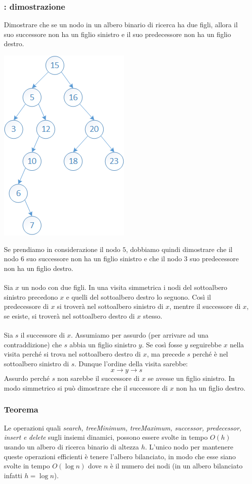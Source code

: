 \documentclass[italian]{article}
\newcommand{\varOmicron}{O}
\newcommand{\exercize}{\text{\faPencil $\;$ Esercizio }}
\begin{document}
\subsubsection{\exercize: dimostrazione}
Dimostrare che se un nodo in un albero binario di ricerca ha due figli, allora il suo successore non ha un figlio sinistro e il suo predecessore non ha un figlio destro.
\begin{center}
	\includegraphics[width=0.3\linewidth]{images/albero_binario_esempio}
\end{center}
Se prendiamo in considerazione il nodo $5$, dobbiamo quindi dimostrare che il nodo $6$ suo successore non ha un figlio sinistro e che il nodo $3$ suo predecessore non ha un figlio destro. \\\\
Sia $x$ un nodo con due figli. In una visita simmetrica i nodi del sottoalbero sinistro precedono $x$ e quelli del sottoalbero destro lo seguono. Così il predecessore di $x$ si troverà nel sottoalbero sinistro di $x$, mentre il successore di $x$, se esiste, si troverà nel sottoalbero destro di $x$ stesso. \\\\
Sia $s$ il successore di $x$. Assumiamo per assurdo (per arrivare ad una contraddizione) che $s$ abbia un figlio sinistro $y$. Se così fosse $y$ seguirebbe $x$ nella visita perché si trova nel sottoalbero destro di $x$, ma precede $s$ perché è nel sottoalbero sinistro di $s$. Dunque l'ordine della visita sarebbe:
\[
	x \to y \to s
\]
Assurdo perché $s$ non sarebbe il successore di $x$ se avesse un figlio sinistro. In modo simmetrico si può dimostrare che il successore di $x$ non ha un figlio destro.

\subsubsection{Teorema}
Le operazioni quali \textit{search, treeMinimum, treeMaximum, successor, predecessor, insert e delete} sugli insiemi dinamici, possono essere svolte in tempo $\varOmicron(h)$ usando un albero di ricerca binario di altezza $h$. L'unico nodo per mantenere queste operazioni efficienti è tenere l'albero bilanciato, in modo che esse siano svolte in tempo $\varOmicron(\log n)$ dove $n$ è il numero dei nodi (in un albero bilanciato infatti $h = \log n$).
\end{document}
